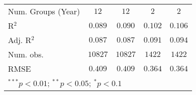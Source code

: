 \begin{table}
\begin{center}
\begin{tabular}{l c c c c}
\midrule
Num. Groups (Year)      & $12$           & $12$           & $2$            & $2$            \\
R$^2$                   & $0.089$        & $0.090$        & $0.102$        & $0.106$        \\
Adj. R$^2$              & $0.087$        & $0.087$        & $0.091$        & $0.094$        \\
Num. obs.               & $10827$        & $10827$        & $1422$         & $1422$         \\
RMSE                    & $0.409$        & $0.409$        & $0.364$        & $0.364$        \\
\bottomrule
\multicolumn{5}{l}{\scriptsize{$^{***}p<0.01$; $^{**}p<0.05$; $^{*}p<0.1$}}
\end{tabular}
\label{table_school_alt_party_coding}
\end{center}
\end{table}
